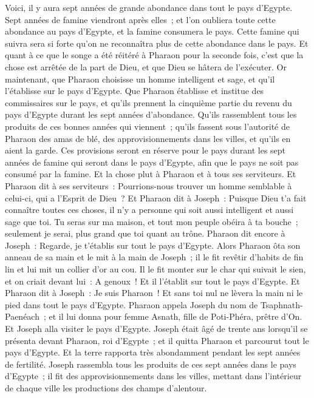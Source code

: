 \begin{multicols}{2}
Voici, il y aura sept années de grande abondance dans tout le pays d'Egypte.
Sept années de famine viendront après elles~; et l'on oubliera toute cette abondance au pays d'Egypte, et la famine consumera le pays.
Cette famine qui suivra sera si forte qu'on ne reconnaîtra plus de cette abondance dans le pays.
Et quant à ce que le songe a été réitéré à Pharaon pour la seconde fois, c'est que la chose est arrêtée de la part de Dieu, et que Dieu se hâtera de l'exécuter.
Or maintenant, que Pharaon choisisse un homme intelligent et sage, et qu'il l'établisse sur le pays d'Egypte.
Que Pharaon établisse et institue des commissaires sur le pays, et qu'ils prennent la cinquième partie du revenu du pays d'Egypte durant les sept années d'abondance.
Qu'ils rassemblent tous les produits de ces bonnes années qui viennent~; qu'ils fassent sous l'autorité de Pharaon des amas de blé, des approvisionnements dans les villes, et qu'ils en aient la garde.
Ces provisions seront en réserve pour le pays durant les sept années de famine qui seront dans le pays d'Egypte, afin que le pays ne soit pas consumé par la famine.
Et la chose plut à Pharaon et à tous ses serviteurs.
Et Pharaon dit à ses serviteurs~: Pourrions-nous trouver un homme semblable à celui-ci, qui a l'Esprit de Dieu~?
Et Pharaon dit à Joseph~: Puisque Dieu t'a fait connaître toutes ces choses, il n'y a personne qui soit aussi intelligent et aussi sage que toi.
Tu seras sur ma maison, et tout mon peuple obéira à ta bouche~; seulement je serai, plus grand que toi quant au trône.
Pharaon dit encore à Joseph~: Regarde, je t'établis sur tout le pays d'Egypte.
Alors Pharaon ôta son anneau de sa main et le mit à la main de Joseph~; il le fit revêtir d'habits de fin lin et lui mit un collier d'or au cou.
Il le fit monter sur le char qui suivait le sien, et on criait devant lui~: A genoux~! Et il l'établit sur tout le pays d'Egypte.
Et Pharaon dit à Joseph~: Je suis Pharaon~! Et sans toi nul ne lèvera la main ni le pied dans tout le pays d'Egypte.
Pharaon appela Joseph du nom de Tsaphnath-Paenéach~; et il lui donna pour femme Asnath, fille de Poti-Phéra, prêtre d'On. Et Joseph alla visiter le pays d'Egypte.
Joseph était âgé de trente ans lorsqu'il se présenta devant Pharaon, roi d'Egypte~; et il quitta Pharaon et parcourut tout le pays d'Egypte.
Et la terre rapporta très abondamment pendant les sept années de fertilité.
Joseph rassembla tous les produits de ces sept années dans le pays d'Egypte~; il fit des approvisionnements dans les villes, mettant dans l'intérieur de chaque ville les productions des champs d'alentour.

\end{multicols}
